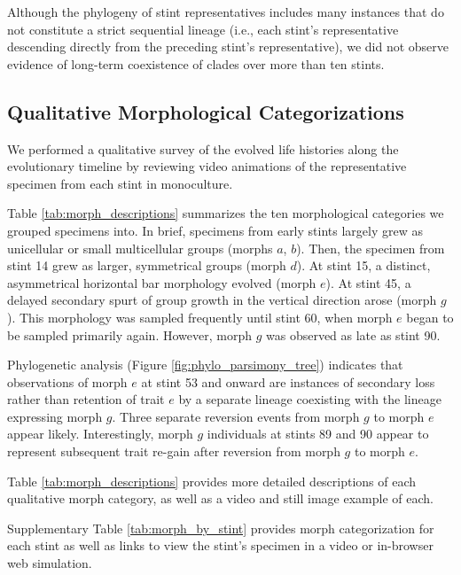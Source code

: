 Although the phylogeny of stint representatives includes many instances that do not constitute a strict sequential lineage (i.e., each stint's representative descending directly from the preceding stint's representative), we did not observe evidence of long-term coexistence of clades over more than ten stints.

\subsection{Qualitative Morphological Categorizations}



We performed a qualitative survey of the evolved life histories along the evolutionary timeline by reviewing video animations of the representative specimen from each stint in monoculture.

Table \ref{tab:morph_descriptions} summarizes the ten morphological categories we grouped specimens into.
In brief, specimens from early stints largely grew as unicellular or small multicellular groups (morphs $a$, $b$).
Then, the specimen from stint 14 grew as larger, symmetrical groups (morph $d$).
At stint 15, a distinct, asymmetrical horizontal bar morphology evolved (morph $e$).
At stint 45, a delayed secondary spurt of group growth in the vertical direction arose (morph $g$).
This morphology was sampled frequently until stint 60, when morph $e$ began to be sampled primarily again.
However, morph $g$ was observed as late as stint 90.

Phylogenetic analysis (Figure \ref{fig:phylo_parsimony_tree}) indicates that observations of morph $e$ at stint 53 and onward are instances of secondary loss rather than retention of trait $e$ by a separate lineage coexisting with the lineage expressing morph $g$.
Three separate reversion events from morph $g$ to morph $e$ appear likely.
Interestingly, morph $g$ individuals at stints 89 and 90 appear to represent subsequent trait re-gain after reversion from morph $g$ to morph $e$.

Table \ref{tab:morph_descriptions} provides more detailed descriptions of each qualitative morph category, as well as a video and still image example of each.

Supplementary Table \ref{tab:morph_by_stint} provides morph categorization for each stint as well as links to view the stint's specimen in a video or in-browser web simulation.

